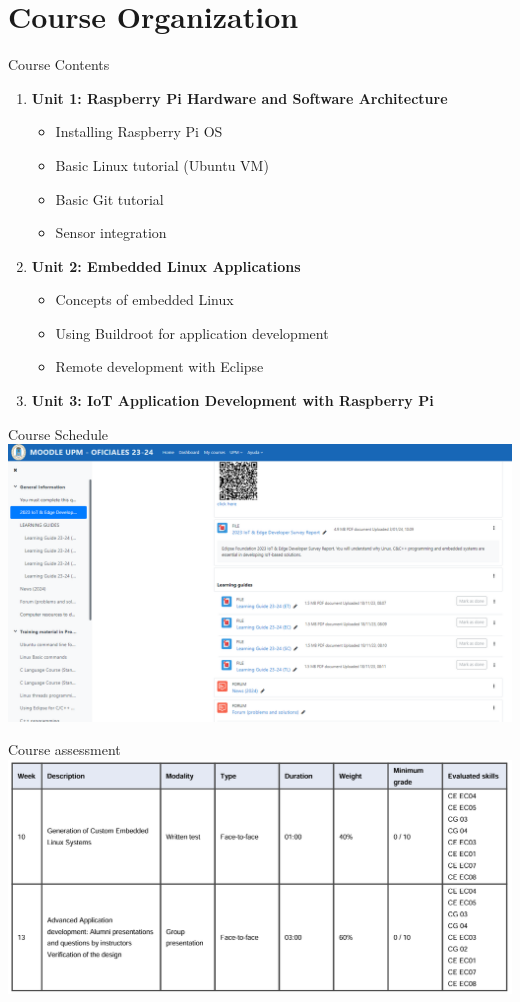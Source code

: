 \section{Course Organization}
\begin{frame}{Course Contents}
  \begin{enumerate}
    \item \textbf{Unit 1: Raspberry Pi Hardware and Software Architecture}
    \begin{itemize}
      \item Installing Raspberry Pi OS
      \item Basic Linux tutorial (Ubuntu VM)
      \item Basic Git tutorial
      \item Sensor integration
    \end{itemize}
    \item \textbf{Unit 2: Embedded Linux Applications}
    \begin{itemize}
      \item Concepts of embedded Linux
      \item Using Buildroot for application development
      \item Remote development with Eclipse
    \end{itemize}
    \item \textbf{Unit 3: IoT Application Development with Raspberry Pi}
  \end{enumerate}
\end{frame}

\begin{frame}{Course Schedule}
    \includegraphics[scale=0.25]{trainingmaterials/presentation/schedule.png}
\end{frame}

\begin{frame}{Course assessment}
    \includegraphics[scale=0.25]{trainingmaterials/presentation/assessment.png}
\end{frame}

